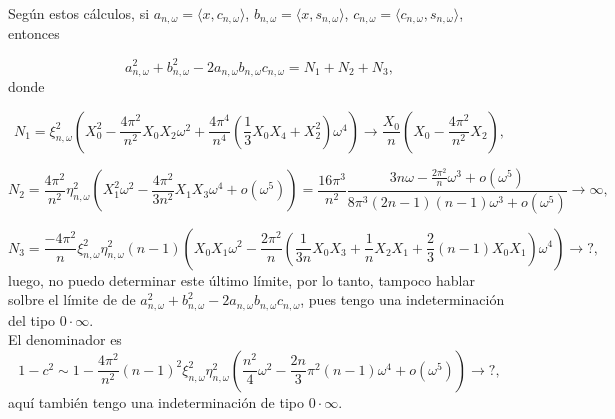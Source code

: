 Según estos cálculos, si
$a_{n, \omega} = \langle x, c_{n, \omega} \rangle$, 
$b_{n, \omega} = \langle x, s_{n, \omega} \rangle$, 
$c_{n, \omega} = \langle c_{n, \omega}, s_{n, \omega} \rangle$, 
entonces

\[
a_{n, \omega}^{2} + b_{n, \omega}^{2} - 
2a_{n, \omega}b_{n, \omega}c_{n, \omega}
= N_{1} + N_{2} +N_{3},
\]
donde

\[
N_{1} =
\xi_{n, \omega}^{2} \left(
X_{0}^{2} - \frac{4\pi^{2}}{n^{2}} X_{0}X_{2}
\omega^{2} + \frac{4 \pi^{4}}{n^{4}}
\left(
\frac{1}{3} X_{0}X_{4} + X_{2}^{2}
\right) \omega^{4}
\right)
\rightarrow 
\frac{X_{0}}{n}
\left(
X_{0}  - \frac{4 \pi^{2}}{n^{2}}X_{2}
\right),
\]

\[
N_{2} = \frac{4 \pi^{2}}{n^{2}} \eta_{n, \omega}^{2}
\left(
X_{1}^{2} \omega^{2} - \frac{4 \pi^{2}}{3n^{2}}X_{1}X_{3} \omega^{4}
+ o(\omega^{5})
\right)
=
\frac{16 \pi^{3}}{n^{2}}
\frac{3n \omega - \frac{2 \pi^{2}}{n} \omega^{3} + o(\omega^{5})}{
8 \pi^{3}(2n-1)(n-1) \omega^{3} + o(\omega^{5})
}
\rightarrow \infty,
\]

\[
N_{3} =
\frac{-4 \pi^{2}}{n}
\xi_{n, \omega}^{2} \eta_{n, \omega}^{2}(n-1)
\left(
X_{0}X_{1}\omega^{2} 
- \frac{2 \pi^{2}}{n}
\left(
\frac{1}{3n} X_{0}X_{3} + \frac{1}{n} X_{2}X_{1}
+ \frac{2}{3}(n-1)X_{0}X_{1}
\right) \omega^{4}
\right)
\rightarrow ?,
\]
luego, no puedo determinar este último límite, por lo tanto,
tampoco hablar solbre el límite de
de $a_{n, \omega}^{2} + b_{n, \omega}^{2} - 
2a_{n, \omega}b_{n, \omega}c_{n, \omega}$, pues
tengo una indeterminación del tipo 
$0 \cdot \infty$. \\

El denominador es
\[
1-c^{2} \sim
1 - \frac{4\pi^{2}}{n^{2}}(n-1)^{2} \xi_{n, \omega}^{2} \eta_{n, \omega}^{2}
\left(
\frac{n^{2}}{4} \omega^{2} - \frac{2n}{3} \pi^{2} (n-1) \omega^{4} + o(\omega^{5})
\right) \rightarrow ?,
\]
aquí también tengo una indeterminación de tipo
$0 \cdot \infty$.